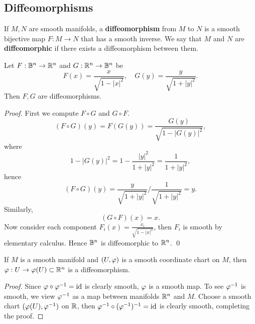 \subsection{Diffeomorphisms}
\begin{definition}
    If $M,N$ are smooth manifolds, a \textbf{diffeomorphism} from $M$ to $N$ is a smooth bijective map $F:M \to N$ that has a smooth inverse. We say that $M$ and $N$ are \textbf{diffeomorphic} if there exists a diffeomorphism between them. 
\end{definition}
\begin{example}
    Let $F: \mathbb{B}^n \to \mathbb{R}^n$ and $G: \mathbb{R}^n \to \mathbb{B}^n$ be
    $$F(x) = \frac{x}{\sqrt{1-|x|^2}}, \quad G(y) = \frac{y}{\sqrt{1+|y|^2}}. $$
    Then $F,G$ are diffeomorphisms. 
\end{example}
\begin{proof}
    First we compute $F \circ G$ and $G \circ F$. 
    $$(F \circ G)(y) = F(G(y)) = \frac{G(y)}{\sqrt{1-|G(y)|^2}}, $$
    where $$1-|G(y)|^2 = 1-\frac{|y|^2}{1+|y|^2} = \frac{1}{1+|y|^2},$$
    hence $$(F \circ G)(y) = \frac{y}{\sqrt{1+|y|^2}} / \frac{1}{\sqrt{1+|y|^2}} = y. $$ Similarly, $$(G \circ F) (x) = x. $$
    Now consider each component $F_i(x) = \frac{x_i}{\sqrt{1-|x|^2}}$, then $F_i$ is smooth by elementary calculus. Hence $\mathbb{B}^n$ is diffeomorphic to $\mathbb{R}^n$. \qed 
\end{proof}
\begin{example}
    If $M$ is a smooth manifold and $(U,\varphi)$ is a smooth coordinate chart on $M$, then $\varphi:U \to \varphi(U) \subset \mathbb{R}^n$ is a diffeomorphism.   
\end{example}
\begin{proof}
    Since $\varphi \circ \varphi^{-1} = \mathrm{id}$ is clearly smooth, $\varphi$ is a smooth map. To see $\varphi^{-1}$ is smooth, we view $\varphi^{-1}$ as a map between manifolds $\mathbb{R}^n$ and $M$. Choose a smooth chart $(\varphi(U), \varphi^{-1})$ on $\mathbb{R}$, then $\varphi^{-1} \circ (\varphi^{-1})^{-1} = \mathrm{id}$ is clearly smooth, completing the proof.   
\end{proof}

